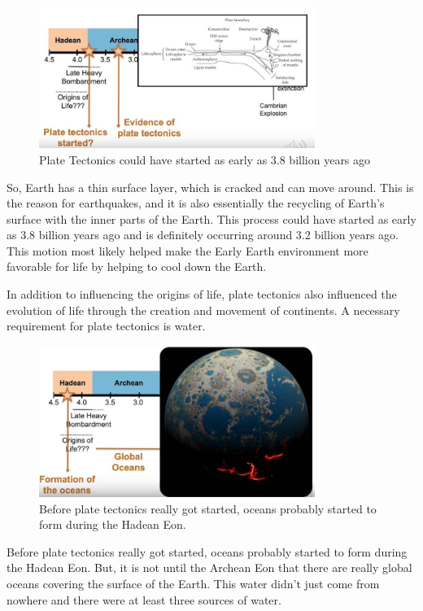 \documentclass[]{article}
\begin{document}
\begin{figure}[H]
	\caption{Plate Tectonics could have started
		as early as 3.8 billion years ago}\label{fig:PlateTectonics}
	\includegraphics[width=0.8\textwidth]{PlateTectonics}
\end{figure}
So, Earth has a thin surface layer,
which is cracked and can move around.
This is the reason for earthquakes,
and it is also essentially
the recycling of Earth's surface
with the inner parts of the Earth.
This process could have started
as early as 3.8 billion years ago
and is definitely occurring
around 3.2 billion years ago.
This motion most likely helped make
the Early Earth environment
more favorable for life
by helping to cool down the Earth.

In addition to influencing
the origins of life,
plate tectonics also influenced
the evolution of life
through the creation
and movement of continents.
A necessary requirement
for plate tectonics is water.

\begin{figure}[H]
	\caption[Formation of Oceans]{Before plate tectonics really got started,
		oceans probably started to form
		during the Hadean Eon.}\label{fig:FormationOfOceans}
	\includegraphics[width=0.8\textwidth]{FormationOfOceans}
\end{figure}
Before plate tectonics really got started,
oceans probably started to form
during the Hadean Eon.
But, it is not until the Archean Eon
that there are really global oceans
covering the surface of the Earth.
This water didn't just come from nowhere
and there were at least
three sources of water.
\end{document}

